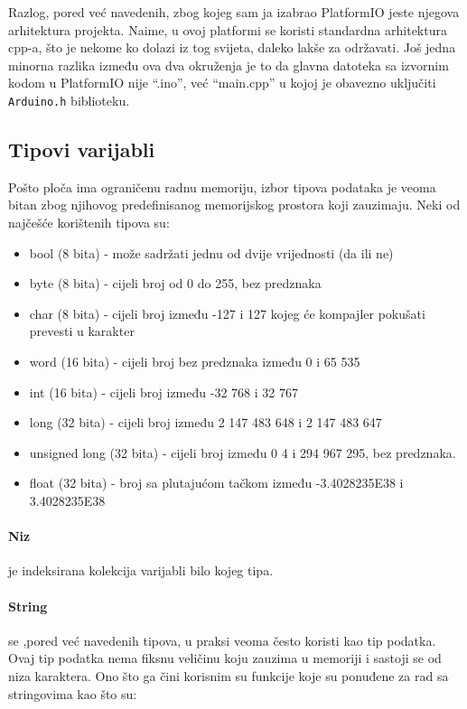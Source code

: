 \documentclass[../Document.tex]{subfiles}
\begin{document}
Razlog, pored već navedenih, zbog kojeg sam ja izabrao PlatformIO jeste njegova arhitektura projekta. Naime, u ovoj platformi se koristi standardna arhitektura cpp-a, što je nekome ko dolazi iz tog svijeta, daleko lakše za održavati. Još jedna minorna razlika između ova dva okruženja je to da glavna datoteka sa izvornim kodom u PlatformIO nije ``.ino'', već ``main.cpp'' u kojoj je obavezno uključiti \verb|Arduino.h| biblioteku.

\subsection{Tipovi varijabli}

Pošto ploča ima ograničenu radnu memoriju, izbor tipova podataka je veoma bitan zbog njihovog predefinisanog memorijskog prostora koji zauzimaju. Neki od najčešće korištenih tipova\cite{arduino} su:

\begin{itemize}
  \item bool (8 bita) - može sadržati jednu od dvije vrijednosti (da ili ne)
  \item byte (8 bita) - cijeli broj od 0 do 255, bez predznaka
  \item char (8 bita) - cijeli broj između -127 i 127 kojeg će kompajler pokušati prevesti u karakter
  \item word (16 bita) - cijeli broj bez predznaka između 0 i 65 535
  \item int (16 bita) - cijeli broj između -32 768 i 32 767
  \item long (32 bita) - cijeli broj između 2 147 483 648 i 2 147 483 647
  \item unsigned long (32 bita) - cijeli broj između 0 4 i 294 967 295, bez predznaka.
  \item float (32 bita) -  broj sa plutajućom tačkom između -3.4028235E38 i 3.4028235E38
\end{itemize}

\paragraph{Niz} je indeksirana kolekcija varijabli bilo kojeg tipa.

\paragraph{String} se ,pored već navedenih tipova, u praksi veoma često koristi kao tip podatka. Ovaj tip podatka nema fiksnu veličinu koju zauzima u memoriji i sastoji se od niza karaktera. Ono što ga čini korisnim su funkcije koje su ponuđene za rad sa stringovima kao što su:
\end{document}
